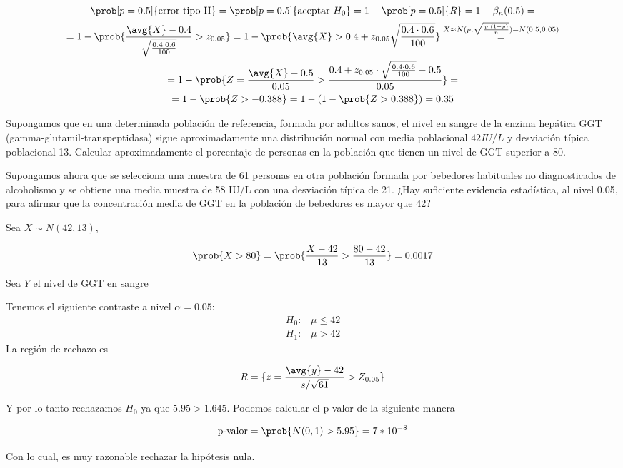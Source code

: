 \begin{problem}[7]
\begin{gather*}
\prob[p = 0.5]{\text{error tipo II}} =
\prob[p = 0.5]{\text{aceptar } H_0} =
1 - \prob[p = 0.5]{R} =
1 - \beta_n(0.5) =\\
= 1 - \prob{\frac{\avg{X} - 0.4}{\sqrt{\frac{0.4 \cdot 0.6}{100}}} > z_{0.05}} =
1 - \prob{\avg{X} > 0.4 + z_{0.05} \sqrt{\frac{0.4 \cdot 0.6} {100}}}
\stackrel{X \approx N(p, \sqrt{\frac{p \cdot(1-p)}{n}}) = N(0.5, 0.05)}{=}\\
= 1 - \prob{Z = \frac{\avg{X} - 0.5}{0.05} > \frac{0.4 + z_{0.05} \cdot \sqrt{\frac{0.4 \cdot 0.6}{100}} - 0.5}{0.05}} =\\
= 1 - \prob{Z > -0.388} =
1 - (1 - \prob{Z > 0.388}) = 0.35
\end{gather*}

\end{problem}


\pagebreak
\begin{problem}[8] 

\ppart Supongamos que en una determinada población de referencia, formada por adultos sanos, el nivel en sangre de la enzima hepática GGT (gamma-glutamil-transpeptidasa) sigue aproximadamente una distribución normal con media poblacional $42 IU/L$ y desviación típica poblacional 13. Calcular aproximadamente el porcentaje de personas en la población que tienen un nivel de GGT superior a 80.

\ppart Supongamos ahora que se selecciona una muestra de 61 personas en otra población formada por bebedores habituales no diagnosticados de alcoholismo y se obtiene una media muestra de 58 IU/L con una desviación típica de 21. ¿Hay suficiente evidencia estadística, al nivel 0.05, para afirmar que la concentración media de GGT en la población de bebedores es mayor que 42?

\solution

\spart
Sea $X \sim N(42, 13)$,

\[
\prob{X > 80} =
\prob{\frac{X-42}{13} > \frac{80 -42}{13}} =
0.0017
\]

\spart
Sea $Y$ el nivel de GGT en sangre

Tenemos el siguiente contraste a nivel $\alpha = 0.05$:
\begin{gather*}
H_0 : \;\;\; \mu \leq 42\\
H_1 : \;\;\; \mu > 42
\end{gather*}
La región de rechazo es

\[ R = \{ z = \frac{\avg{y} - 42}{s/\sqrt{61}} > Z_{0.05} \} \]

Y por lo tanto rechazamos $H_0$ ya que $5.95 > 1.645$. Podemos calcular el p-valor de la siguiente manera

\[
\text{p-valor} =
\prob{N(0, 1) > 5.95} = 7*10^{-8}
\]

Con lo cual, es muy razonable rechazar la hipótesis nula.

\end{problem}

